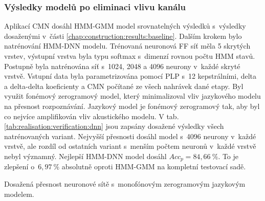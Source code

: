 
\subsubsection{Výsledky modelů po eliminaci vlivu kanálu}

Aplikací CMN dosáhl HMM-GMM model srovnatelných výsledků s~výsledky dosaženými v~části \ref{chap:construction:results:baseline}.
Dalším krokem bylo natrénování HMM-DNN modelu.
Trénovaná neuronová FF síť měla 5 skrytých vrstev, výstupní vrstva byla typu softmax s~dimenzí rovnou počtu HMM stavů.
Postupně byla natrénována síť s~1024, 2048 a 4096 neurony v~každé skryté vrstvě.
Vstupní data byla parametrizována pomocí PLP s~12 kepstrálními, delta a delta-delta koeficienty a CMN počítané ze všech nahrávek dané etapy.
Byl využit fonémový zerogramový model, který minimalizoval vliv jazykového modelu na přesnost rozpoznávání.
Jazykový model je fonémový zerogramový tak, aby byl co nejvíce amplifikován vliv akustického modelu.
V tab. \ref{tab:realisation:verification:dnn} jsou zapsány dosažené výsledky všech natrénovaných variant.
Nejvyšší přesnosti dosáhl model s~4096 neurony v~každé vrstvě, ale rozdíl od ostatních variant s~menším počtem neuronů v~každé vrstvě nebyl významný.
Nejlepší HMM-DNN model dosáhl $Acc_{p} = 84,66~\%$.
To je zlepšení o~$6,97~\%$ absolutně oproti HMM-GMM na kompletní testovací sadě.

\begin{table}[htpb]
  \centering
  \def\arraystretch{1.5}
  \caption[Přesnost neuronové sítě s~monofónovým zerogramovým LM.]{Dosažená přesnost neuronové sítě s~monofónovým zerogramovým jazykovým modelem.}
  \label{tab:realisation:verification:dnn}
\end{table}
